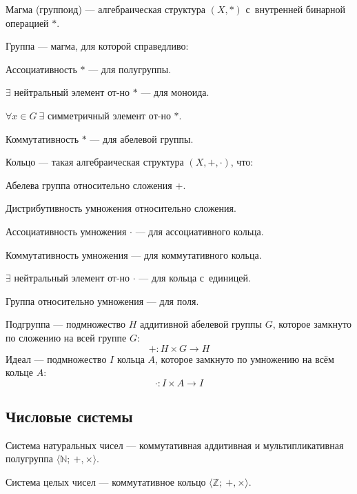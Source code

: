 {\bold Магма} {\ital (группоид)} --- алгебраическая структура $(X,\ast)$ с~внутренней бинарной операцией $\ast$.

{\bold Группа} --- магма, для которой справедливо:
\begin{list*}[][\#]
\item Ассоциативность $\ast$ --- для {\bold полугруппы}.
\item $\exists$ нейтральный элемент от-но $\ast$ --- для {\bold моноида}.
\item $\forall x\in G\ \exists$ симметричный элемент от-но $\ast$.
{\color{desc}\item Коммутативность $\ast$ --- для {\bold абелевой} группы.}
\end{list*}
{\bold Кольцо} --- такая алгебраическая структура $(X,+,\cdot)$, что:
\begin{list*}[][\#]
\item Абелева группа относительно {\ital сложения} $+$.
\item Дистрибутивность {\ital умножения} относительно {\ital сложения}.
{\color{desc}\item Ассоциативность {\ital умножения} $\cdot$ --- для {\bold ассоциативного кольца}.}
{\color{desc}\item Коммутативность {\ital умножения} --- для {\bold коммутативного кольца}.}
{\color{desc}\item $\exists$ нейтральный элемент от-но $\cdot$ --- для {\bold кольца с~единицей}.}
{\color{desc}\item Группа относительно {\ital умножения} --- для {\bold поля}.}
\end{list*}


{\bold Подгруппа} --- подмножество $H$ аддитивной абелевой группы $G$, которое замкнуто по сложению на всей группе $G$:
$$+\colon H\times G\to H$$
{\bold Идеал} --- подмножество $I$ кольца $A$, которое замкнуто по умножению на всём кольце $A$:
$$\cdot\colon I\times A\to I$$

\subsection{Числовые системы}

{\bold Система натуральных чисел} --- коммутативная аддитивная и мультипликативная полугруппа $\langle\mathbb{N};\ +,\times\rangle$.\par

{\bold Система целых чисел} --- коммутативное кольцо $\langle\mathbb{Z};\ +,\times\rangle$.
\par

